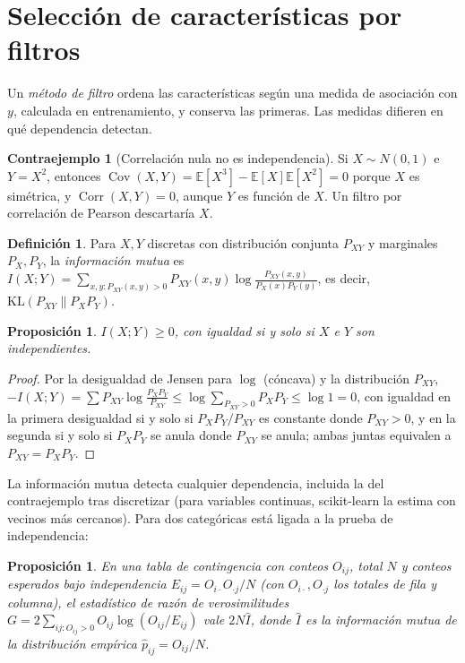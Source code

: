 \documentclass[11pt,a4paper]{article}
\theoremstyle{plain}
\newtheorem{proposicion}[teorema]{Proposición}
\theoremstyle{definition}
\newtheorem{definicion}[teorema]{Definición}
\newtheorem{contraejemplo}[teorema]{Contraejemplo}
\theoremstyle{remark}
\newcommand{\E}{\mathbb{E}}
\newcommand{\Cov}{\operatorname{Cov}}
\newcommand{\Corr}{\operatorname{Corr}}
\newcommand{\1}{\mathbf{1}}
\begin{document}
\section{Selección de características por filtros}\label{sec:seleccion}

Un \emph{método de filtro} ordena las características según una medida de
asociación con $y$, calculada en entrenamiento, y conserva las primeras.
Las medidas difieren en qué dependencia detectan.

\begin{contraejemplo}[Correlación nula no es independencia]
Si $X\sim N(0,1)$ e $Y=X^2$, entonces $\Cov(X,Y)=\E[X^3]-\E[X]\E[X^2]=0$
porque $X$ es simétrica, y $\Corr(X,Y)=0$, aunque $Y$ es función de $X$.
Un filtro por correlación de Pearson descartaría $X$.
\end{contraejemplo}

\begin{definicion}
Para $X,Y$ discretas con distribución conjunta $P_{XY}$ y marginales
$P_X,P_Y$, la \emph{información mutua} es
$I(X;Y)=\sum_{x,y:P_{XY}(x,y)>0}P_{XY}(x,y)\log\frac{P_{XY}(x,y)}{P_X(x)P_Y(y)}$,
es decir, $\mathrm{KL}(P_{XY}\|P_XP_Y)$.
\end{definicion}

\begin{proposicion}
$I(X;Y)\ge0$, con igualdad si y solo si $X$ e $Y$ son independientes.
\end{proposicion}

\begin{proof}
Por la desigualdad de Jensen para $\log$ (cóncava) y la distribución
$P_{XY}$,
$-I(X;Y)=\sum P_{XY}\log\frac{P_XP_Y}{P_{XY}}\le\log\sum_{P_{XY}>0}P_XP_Y\le\log1=0$,
con igualdad en la primera desigualdad si y solo si
$P_XP_Y/P_{XY}$ es constante donde $P_{XY}>0$, y en la segunda si y solo
si $P_XP_Y$ se anula donde $P_{XY}$ se anula; ambas juntas equivalen a
$P_{XY}=P_XP_Y$.
\end{proof}

La información mutua detecta cualquier dependencia, incluida la del
contraejemplo tras discretizar (para variables continuas, scikit-learn la
estima con vecinos más cercanos). Para dos categóricas está ligada a la
prueba de independencia:

\begin{proposicion}
En una tabla de contingencia con conteos $O_{ij}$, total $N$ y conteos
esperados bajo independencia $E_{ij}=O_{i\cdot}O_{\cdot j}/N$ (con
$O_{i\cdot},O_{\cdot j}$ los totales de fila y columna), el estadístico de
razón de verosimilitudes $G=2\sum_{ij:O_{ij}>0}O_{ij}\log(O_{ij}/E_{ij})$
vale $2N\hat I$, donde $\hat I$ es la información mutua de la distribución
empírica $\hat p_{ij}=O_{ij}/N$.
\end{proposicion}
\end{document}
